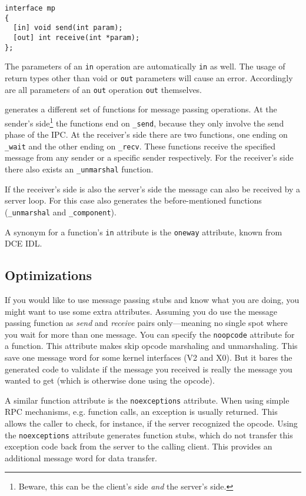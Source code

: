 \begin{verbatim}
interface mp
{
  [in] void send(int param);
  [out] int receive(int *param);
};
\end{verbatim}

The parameters of an \verb|in| operation are automatically \verb|in| as
well. The usage of return types other than void or \verb|out| parameters
will cause an error. Accordingly are all parameters of an \verb|out|
operation \verb|out| themselves.

\dice{} generates a different set of functions for message passing
operations. At the sender's side\footnote{Beware, this can be the client's
side \emph{and} the server's side.} the functions end on \verb|_send|, because
they only involve the send phase of the IPC. At the receiver's side
there are two functions, one ending on \verb|_wait| and the other ending
on \verb|_recv|. These functions receive the specified message from
any sender or a specific sender respectively. For the receiver's side
there also exists an \verb|_unmarshal| function.

If the receiver's side is also the server's side the message
can also be received by a server loop. For this case \dice{} also
generates the before-mentioned functions (\verb|_unmarshal| and 
\verb|_component|). 

A synonym for a function's \verb|in| attribute is the \verb|oneway|
attribute, known from DCE IDL.

\subsection{Optimizations}
If you would like to use message passing stubs and know what you are
doing, you might want to use some extra attributes. Assuming you do
use the message passing function as \emph{send} and \emph{receive}
pairs only---meaning no single spot where you wait for more than one
message. You can specify the \verb|noopcode| attribute for a function.
This attribute makes \dice{} skip opcode marshaling and unmarshaling.
This save one message word for some kernel interfaces (V2 and X0).
But it bares the generated code to validate if the message you received
is really the message you wanted to get (which is otherwise done using
the opcode).

A similar function attribute is the \verb|noexceptions| attribute. When
using simple RPC mechanisms, e.g. function calls, an exception is 
usually returned. This allows the caller to check, for instance, if the
server recognized the opcode. Using the \verb|noexceptions| attribute
generates function stubs, which do not transfer this exception code
back from the server to the calling client. This provides an additional
message word for data transfer.

